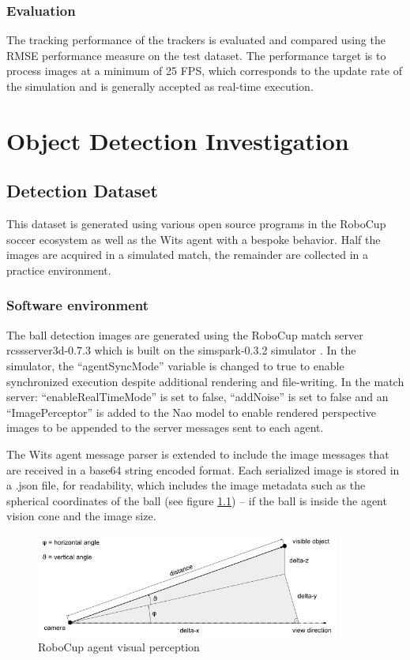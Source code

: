 \documentclass[a4paper,twoside,12pt]{report}
\begin{document}
\subsection{Evaluation}

The tracking performance of the trackers is evaluated and compared using the RMSE performance measure on the test dataset. The performance target is to process images at a minimum of 25 FPS, which corresponds to the update rate of the simulation and is generally accepted as real-time execution.
\chapter{Object Detection Investigation}

\section{Detection Dataset}
This dataset is generated using various open source programs in the RoboCup soccer ecosystem as well as the Wits agent with a bespoke behavior. Half the images are acquired in a simulated match, the remainder are collected in a practice environment.

\subsection{Software environment}
The ball detection images are generated using the RoboCup match server rcssserver3d-0.7.3 which is built on the simspark-0.3.2 simulator  \citep{perceptors}. In the simulator, the ``agentSyncMode'' variable is changed to true to enable synchronized execution despite additional rendering and file-writing. In the match server: ``enableRealTimeMode'' is set to false, ``addNoise'' is set to false and an ``ImagePerceptor'' is added to the Nao model to enable rendered perspective images to be appended to the server messages sent to each agent.  

The Wits agent message parser is extended to include the image messages that are received in a base64 string encoded format. Each serialized image is stored in a .json file, for readability, which includes the image metadata such as the spherical coordinates of the ball (see figure \ref{fig:spherical}) -- if the ball is inside the agent vision cone and the image size. 

\begin{figure}[h!]
\begin{center}
\includegraphics[width=10cm]{images/Vision_Perception.png}
\caption{RoboCup agent visual perception \citep{perceptors}}
\label{fig:spherical}
\end{center}
\end{figure}
\end{document}
